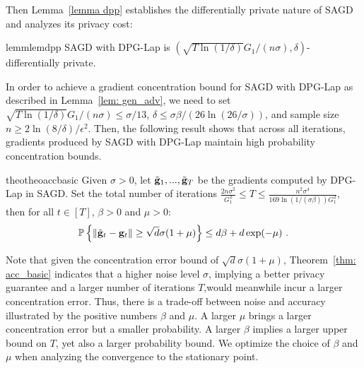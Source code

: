 \documentclass[11pt]{article}
\begin{document}
Then Lemma~\ref{lemma dpp} establishes the differentially private nature of \textsc{SAGD} and analyzes its privacy cost:
\begin{restatable}{lemm}{lemdpp}
\label{lemma dpp}
\textsc{SAGD} with DPG-Lap is $(\sqrt{T \ln(1/\delta)} G_1/(n\sigma), \delta)$-differentially private. 
\end{restatable}  
In order to achieve a gradient concentration bound for \textsc{SAGD} with DPG-Lap as described in Lemma~\ref{lem: gen_adv}, we need to set $\sqrt{T \ln(1/\delta)} G_1/(n\sigma)\leq \sigma/13$, $\delta \leq \sigma \beta/(26 \ln(26/\sigma))$, and  sample size $n \geq 2\ln(8/\delta)/\epsilon^2$. 
Then, the following result shows that across all iterations, gradients produced by \textsc{SAGD} with DPG-Lap maintain high probability concentration bounds.
\begin{restatable}{theo}{theoaccbasic}
\label{thm: acc_basic}
Given $\sigma > 0$, let $\tilde {\mathbf{g}}_1,...,  \tilde {\mathbf{g}}_T$ be the gradients computed by DPG-Lap in \textsc{SAGD}. Set the total number of iterations $ \frac{2n\sigma^2}{G_1^2}\leq T \leq \frac{n^2 \sigma^4}{169 \ln(1/(\sigma \beta))G_1^2}$, then for all $t \in [T]$, $\beta >0$ and $\mu > 0$:
    \begin{equation*}
    \mathbb{P}\left\{\|\tilde {\mathbf{g}}_t - \mathbf{g}_t\| \geq \sqrt{d}\sigma(1+\mu)\right\} \leq d\beta + d\exp(-\mu)~.
    \end{equation*}
\end{restatable}
Note that given the concentration error bound of $\sqrt{d}\sigma(1+\mu)$, Theorem~\ref{thm: acc_basic} indicates that a higher noise level $\sigma$, implying a better privacy guarantee and a larger number of iterations $T$,would meanwhile incur a larger concentration error.
Thus, there is a trade-off between noise and accuracy illustrated by the positive numbers $\beta$ and $\mu$.
A larger $\mu$ brings a larger concentration error but a smaller probability. 
A larger $\beta$ implies a larger upper bound on $T$, yet also a larger probability bound. 
We optimize the choice of $\beta$ and $\mu$ when analyzing the convergence to the stationary point.
\end{document}

